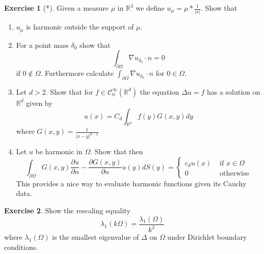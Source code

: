 \documentclass[a4paper,11pt]{article}
\theoremstyle{definition}
\newtheorem{exercise}{Exercise}
\begin{document}
\begin{exercise}[*]
	Given a measure $\mu$ in $\mathbb{R}^3$ we define $u_\mu = \mu * \frac{1}{|x|}$. Show that
	\begin{enumerate}
		\item $u_\mu$ is harmonic outside the support of $\mu$.
		\item For a point mass $\delta_0$ show that 
		\[\int_{\partial \Omega} \nabla u_{\delta_0} \cdot n = 0\]
		if $0 \not\in \Omega$. Furthermore calculate $\int_{\partial \Omega} \nabla u_{\delta_0} \cdot n$ for $0 \in \Omega$.
		\item Let $d>2$. Show that for $f \in \mathcal{C}^\infty_0(\mathbb{R}^d)$ the equation $\Delta u = f$ has a solution on $\mathbb{R}^d$ given by
		\[u(x) = C_d \int_{\mathbb{R}^d} f(y) G(x,y) dy\]
		where $G(x,y) = \frac{1}{|x-y|^{d-2}}$
		\item Let $u$ be harmonic in $\Omega$. Show that then
		\[\int_{\partial \Omega} G(x,y) \frac{\partial u}{\partial n} - \frac{\partial G(x,y)}{\partial n} u(y) dS(y)  = \begin{cases}
			c_d u(x) &\text{ if } x \in \Omega \\
			0 &\text{ otherwise}
		\end{cases}\]
		This provides a nice way to evaluate harmonic functions given its Cauchy data.
	\end{enumerate}
\end{exercise}

\begin{exercise}
	Show the rescaling equality
	\[\lambda_1(k \Omega) = \frac{\lambda_1(\Omega)}{k^2}\]
	where $\lambda_1(\Omega)$ is the smallest eigenvalue of $\Delta$ on $\Omega$ under Dirichlet boundary conditions.
\end{exercise}
\end{document}

